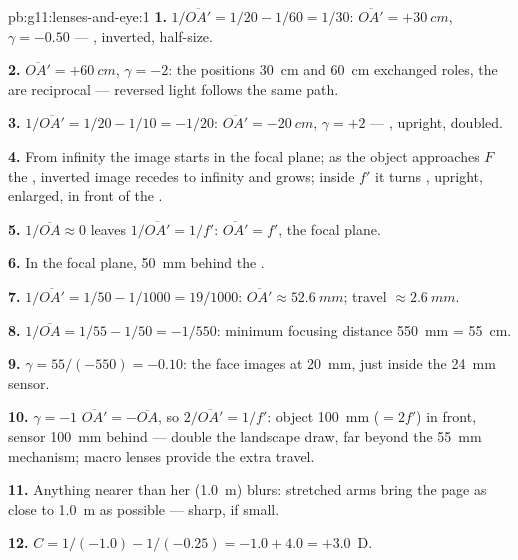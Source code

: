 \begin{solution}{pb:g11:lenses-and-eye:1}
\textbf{1.} $1/\overline{OA'} = 1/20 - 1/60 = 1/30$:
$\overline{OA'} = +\qty{30}{cm}$, $\gamma = -0.50$ --- , inverted,
half-size.

\textbf{2.} $\overline{OA'} = +\qty{60}{cm}$, $\gamma = -2$: the
positions \qty{30}{cm} and \qty{60}{cm} exchanged roles, the
 are reciprocal --- reversed light follows the same
path.

\textbf{3.} $1/\overline{OA'} = 1/20 - 1/10 = -1/20$:
$\overline{OA'} = \qty{-20}{cm}$, $\gamma = +2$ --- , upright,
doubled.

\textbf{4.} From infinity the image starts in the focal plane; as the
object approaches $F$ the , inverted image recedes to infinity and
grows; inside $f'$ it turns , upright, enlarged, in front of
the .

\textbf{5.} $1/\overline{OA} \approx 0$ leaves
$1/\overline{OA'} = 1/f'$: $\overline{OA'} = f'$, the focal plane.

\textbf{6.} In the focal plane, \qty{50}{mm} behind the .

\textbf{7.} $1/\overline{OA'} = 1/50 - 1/1000 = 19/1000$:
$\overline{OA'} \approx \qty{52.6}{mm}$; travel $\approx \qty{2.6}{mm}$.

\textbf{8.} $1/\overline{OA} = 1/55 - 1/50 = -1/550$: minimum focusing
distance \qty{550}{mm} = \qty{55}{cm}.

\textbf{9.} $\gamma = 55/(-550) = -0.10$: the face images at
\qty{20}{mm}, just inside the \qty{24}{mm} sensor.

\textbf{10.} $\gamma = -1$  $\overline{OA'} = -\overline{OA}$,
so $2/\overline{OA'} = 1/f'$: object \qty{100}{mm} ($= 2f'$) in front,
sensor \qty{100}{mm} behind --- double the landscape draw, far beyond
the \qty{55}{mm} mechanism; macro lenses provide the extra travel.

\textbf{11.} Anything nearer than her  (\qty{1.0}{m}) blurs:
stretched arms bring the page as close to \qty{1.0}{m} as possible ---
sharp, if small.

\textbf{12.} $C = 1/(-1.0) - 1/(-0.25) = -1.0 + 4.0 = +3.0$~D.


\end{solution}
